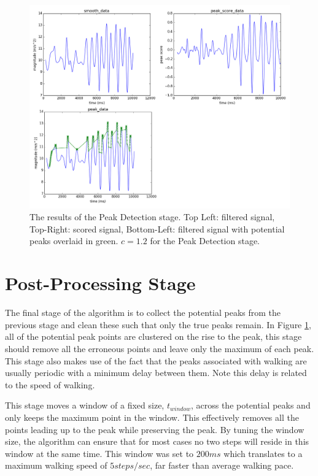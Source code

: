             \begin{figure}[!th]
                \includegraphics[width=\textwidth]{Images/detection_stage.png}
                \centering
                \caption{The results of the Peak Detection stage. Top Left: filtered signal, Top-Right: scored signal, Bottom-Left: filtered signal with potential peaks overlaid in green. $c=1.2$ for the Peak Detection stage.}
                \label{img_detection_stage}
            \end{figure}

        \section{Post-Processing Stage}

            The final stage of the algorithm is to collect the potential peaks from the previous stage and clean these such that only the true peaks remain. In Figure \ref{img_detection_stage}, all of the potential peak points are clustered on the rise to the peak, this stage should remove all the erroneous points and leave only the maximum of each peak. This stage also makes use of the fact that the peaks associated with walking are usually periodic with a minimum delay between them. Note this delay is related to the speed of walking.

            This stage moves a window of a fixed size, $t_{window}$, across the potential peaks and only keeps the maximum point in the window. This effectively removes all the points leading up to the peak while preserving the peak. By tuning the window size, the algorithm can ensure that for most cases no two steps will reside in this window at the same time. This window was set to $200ms$ which translates to a maximum walking speed of $5 steps/sec$, far faster than average walking pace.

